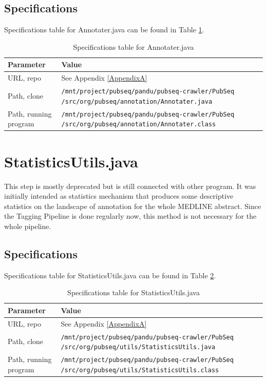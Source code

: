 \subsection{Specifications}

Specifications table for Annotater.java can be found in Table \ref{tab:Annotater}.

\begin{table}[htbp]
\caption{Specifications table for Annotater.java}
\centering
\begin{tabularx}{\textwidth}{ | l | X | }
  \hline
  Parameter & Value \\
  \hline
  URL, repo & See Appendix \ref{AppendixA} \\
  Path, clone & \texttt{/mnt/project/pubseq/pandu/pubseq-crawler/PubSeq /src/org/pubseq/annotation/Annotater.java} \\
  Path, running program & \texttt{/mnt/project/pubseq/pandu/pubseq-crawler/PubSeq /src/org/pubseq/annotation/Annotater.class}\\
  \hline
\end{tabularx}
\label{tab:Annotater}
\end{table}


\section{StatisticsUtils.java}


This step is mostly deprecated but is still connected with other program. It was initially intended as statistics mechanism that produces some descriptive statistics on the landscape of annotation for the whole MEDLINE abstract. Since the Tagging Pipeline is done regularly now, this method is not necessary for the whole pipeline.

\subsection{Specifications}

Specifications table for StatisticsUtils.java can be found in Table \ref{tab:StatisticsUtils}.

\begin{table}[htbp]
\caption{Specifications table for StatisticsUtils.java}
\centering
\begin{tabularx}{\textwidth}{ | l | X | }
  \hline
  Parameter & Value \\
  \hline
  URL, repo & See Appendix \ref{AppendixA} \\
  Path, clone & \texttt{/mnt/project/pubseq/pandu/pubseq-crawler/PubSeq /src/org/pubseq/utils/StatisticsUtils.java} \\
  Path, running program & \texttt{/mnt/project/pubseq/pandu/pubseq-crawler/PubSeq /src/org/pubseq/utils/StatisticsUtils.class}\\
  \hline
\end{tabularx}
\label{tab:StatisticsUtils}
\end{table}

